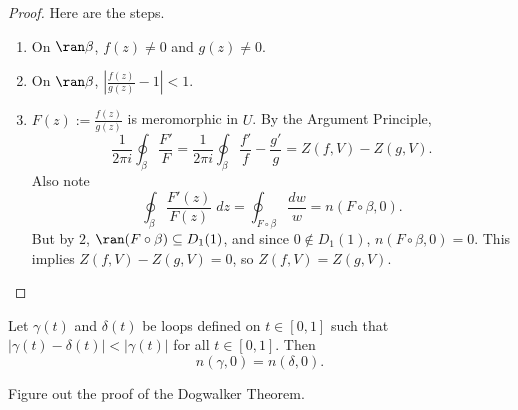 \begin{proof}
    Here are the steps.
    \begin{enumerate}
        \item On $\ran \beta$, $f(z) \ne 0$ and $g(z) \ne 0$.
        \item On $\ran \beta$, $\left|\frac{f(z)}{g(z)}-1\right| < 1$.
        \item $F(z) := \frac{f(z)}{g(z)}$ is meromorphic in $U$.
            By the Argument Principle,
            \[ \frac{1}{2\pi i} \oint_{\beta} \frac{F'}{F} =
                \frac{1}{2\pi i} \oint_{\beta} \frac{f'}{f} - \frac{g'}{g}
            = Z(f, V) - Z(g, V). \]
            Also note
            \[ \oint_{\beta} \frac{F'(z)}{F(z)} \; dz = 
                \oint_{F \circ \beta} \frac{dw}{w} = n(F \circ \beta, 0).
            \]
            But by $2$, $\ran (F \circ \beta) \subseteq D_1(1)$, and
            since $0 \notin D_1(1)$, $n(F \circ \beta, 0) = 0$.
            This implies $Z(f, V) - Z(g, V) = 0$, so $Z(f, V) = Z(g, V)$.
    \end{enumerate}
\end{proof}

\begin{theorem}
    Let $\gamma(t)$ and $\delta(t)$ be loops defined on $t \in [0,1]$
    such that $|\gamma(t) - \delta(t)|
    < |\gamma(t)|$ for all $t \in [0,1]$.
    Then
    \[ n(\gamma, 0) = n(\delta, 0). \]
\end{theorem}

\begin{exercise*}
    Figure out the proof of the Dogwalker Theorem.
\end{exercise*}
